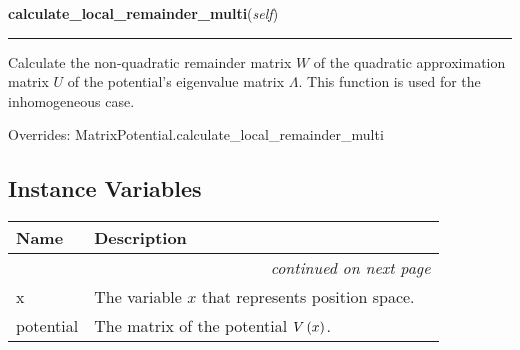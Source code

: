 \hspace{.8\funcindent}\begin{boxedminipage}{\funcwidth}

    \raggedright \textbf{calculate\_local\_remainder\_multi}(\textit{self})

    \vspace{-1.5ex}

    \rule{\textwidth}{0.5\fboxrule}
\setlength{\parskip}{2ex}
    Calculate the non-quadratic remainder matrix $W$ of the quadratic
    approximation matrix $U$ of the potential's eigenvalue matrix
    $\Lambda$. This function is used for the inhomogeneous
    case.

\setlength{\parskip}{1ex}


      Overrides: MatrixPotential.calculate\_local\_remainder\_multi

    \end{boxedminipage}


\newpage


  \subsection{Instance Variables}

    \vspace{-1cm}
\hspace{\varindent}\begin{longtable}{|p{\varnamewidth}|p{\vardescrwidth}|l}
\cline{1-2}
\cline{1-2} \centering \textbf{Name} & \centering \textbf{Description}& \\
\cline{1-2}
\endhead\cline{1-2}\multicolumn{3}{r}{\small\textit{continued on next page}}\\\endfoot\cline{1-2}
\endlastfoot\raggedright x\- & The variable $x$ that represents position space.&\\
\cline{1-2}
\raggedright p\-o\-t\-e\-n\-t\-i\-a\-l\- & The matrix of the potential $V\left( x \right)$.&\\
\cline{1-2}
\end{longtable}

